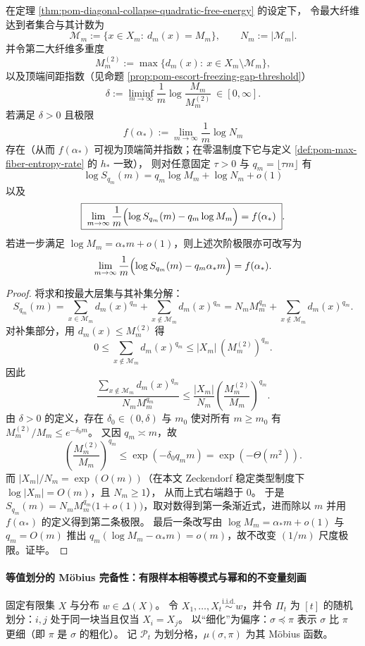 \begin{theorem}\label{thm:pom-diagonal-subleading-top-degeneracy}
在定理 \ref{thm:pom-diagonal-collapse-quadratic-free-energy} 的设定下，
令最大纤维达到者集合与其计数为
\[
\mathcal{M}_m:=\{x\in X_m:\ d_m(x)=M_m\},
\qquad
N_m:=|\mathcal{M}_m|.
\]
并令第二大纤维多重度
\[
M_m^{(2)}:=\max\{d_m(x):\ x\in X_m\setminus\mathcal{M}_m\},
\]
以及顶端间距指数（见命题 \ref{prop:pom-escort-freezing-gap-threshold}）
\[
\delta:=\liminf_{m\to\infty}\frac{1}{m}\log\frac{M_m}{M_m^{(2)}}\ \in[0,\infty].
\]
若满足 \(\delta>0\) 且极限
\[
f(\alpha_\ast):=\lim_{m\to\infty}\frac{1}{m}\log N_m
\]
存在（从而 \(f(\alpha_\ast)\) 可视为顶端简并指数；在零温制度下它与定义 \ref{def:pom-max-fiber-entropy-rate} 的 \(h_\ast\) 一致），
则对任意固定 \(\tau>0\) 与 \(q_m=\lfloor\tau m\rfloor\) 有
\[
\boxed{\;
\log S_{q_m}(m)=q_m\log M_m+\log N_m+o(1)\;}
\]
以及
\[
\boxed{\;
\lim_{m\to\infty}\frac{1}{m}\Bigl(\log S_{q_m}(m)-q_m\log M_m\Bigr)=f(\alpha_\ast)\; }.
\]
若进一步满足 \(\log M_m=\alpha_\ast m+o(1)\)，则上述次阶极限亦可改写为
\[
\lim_{m\to\infty}\frac{1}{m}\Bigl(\log S_{q_m}(m)-q_m\alpha_\ast m\Bigr)=f(\alpha_\ast).
\]
\end{theorem}
\begin{proof}
将求和按最大层集与其补集分解：
\[
S_{q_m}(m)=\sum_{x\in\mathcal{M}_m}d_m(x)^{q_m}+\sum_{x\notin\mathcal{M}_m}d_m(x)^{q_m}
=N_m M_m^{q_m}+\sum_{x\notin\mathcal{M}_m}d_m(x)^{q_m}.
\]
对补集部分，用 \(d_m(x)\le M_m^{(2)}\) 得
\[
0\le \sum_{x\notin\mathcal{M}_m}d_m(x)^{q_m}\le |X_m|\,(M_m^{(2)})^{q_m}.
\]
因此
\[
\frac{\sum_{x\notin\mathcal{M}_m}d_m(x)^{q_m}}{N_m M_m^{q_m}}
\le
\frac{|X_m|}{N_m}\left(\frac{M_m^{(2)}}{M_m}\right)^{q_m}.
\]
由 \(\delta>0\) 的定义，存在 \(\delta_0\in(0,\delta)\) 与 \(m_0\) 使对所有 \(m\ge m_0\) 有 \(M_m^{(2)}/M_m\le e^{-\delta_0 m}\)。
又因 \(q_m\asymp m\)，故
\[
\left(\frac{M_m^{(2)}}{M_m}\right)^{q_m}\le \exp(-\delta_0 q_m m)=\exp(-\Theta(m^2)).
\]
而 \(|X_m|/N_m=\exp(O(m))\)（在本文 Zeckendorf 稳定类型制度下 \(\log|X_m|=O(m)\)，且 \(N_m\ge 1\)），
从而上式右端趋于 \(0\)。
于是
\(
S_{q_m}(m)=N_m M_m^{q_m}\bigl(1+o(1)\bigr)
\)，取对数得到第一条渐近式，进而除以 \(m\) 并用 \(f(\alpha_\ast)\) 的定义得到第二条极限。
最后一条改写由 \(\log M_m=\alpha_\ast m+o(1)\) 与 \(q_m=O(m)\) 推出
\(
q_m(\log M_m-\alpha_\ast m)=o(m)
\)，故不改变 \((1/m)\) 尺度极限。证毕。
\end{proof}

\paragraph{等值划分的 Möbius 完备性：有限样本相等模式与幂和的不变量刻画}
固定有限集 \(X\) 与分布 \(w\in\Delta(X)\)。
令 \(X_1,\dots,X_t\stackrel{\mathrm{i.i.d.}}{\sim} w\)，并令 \(\Pi_t\) 为 \([t]\) 的随机划分：\(i,j\) 处于同一块当且仅当 \(X_i=X_j\)。
以“细化”为偏序：\(\sigma\preceq\pi\) 表示 \(\sigma\) 比 \(\pi\) 更细（即 \(\pi\) 是 \(\sigma\) 的粗化）。
记 \(\mathcal{P}_t\) 为划分格，\(\mu(\sigma,\pi)\) 为其 Möbius 函数。

